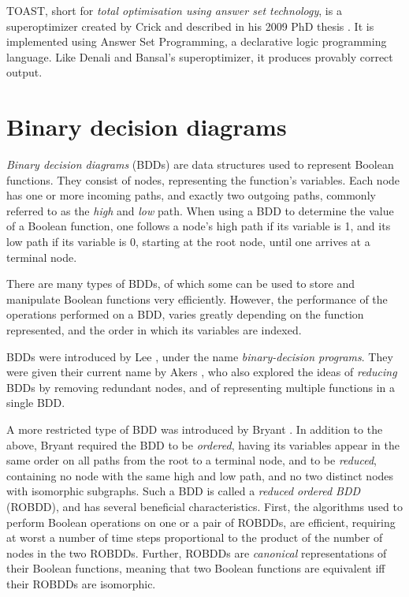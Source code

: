 \documentclass[a4paper,11pt]{kth-mag}
\begin{document}
TOAST, short for \emph{total optimisation using answer set technology}, is a superoptimizer created by Crick and described in his 2009 PhD thesis \cite{crick_thesis}.
It is implemented using Answer Set Programming, a declarative logic programming language.
Like Denali and Bansal's superoptimizer, it produces provably correct output.

%

\section{Binary decision diagrams}

\emph{Binary decision diagrams} (BDDs) are data structures used to represent Boolean functions.
They consist of nodes, representing the function's variables. Each node has one or more incoming paths, and exactly two outgoing paths, commonly referred to as the \emph{high} and \emph{low} path.
When using a BDD to determine the value of a Boolean function, one follows a node's high path if its variable is 1, and its low path if its variable is 0, starting at the root node, until one arrives at a terminal node.

There are many types of BDDs, of which some can be used to store and manipulate Boolean functions very efficiently.
However, the performance of the operations performed on a BDD, varies greatly depending on the function represented, and the order in which its variables are indexed.

BDDs were introduced by Lee \cite{lee59}, under the name \emph{binary-decision programs}.
They were given their current name by Akers \cite{akers78}, who also explored the ideas of \emph{reducing} BDDs by removing redundant nodes, and of representing multiple functions in a single BDD.

A more restricted type of BDD was introduced by Bryant \cite{bryant86}.
In addition to the above, Bryant required the BDD to be \emph{ordered}, having its variables appear in the same order on all paths from the root to a terminal node,
and to be \emph{reduced}, containing no node with the same high and low path, and no two distinct nodes with isomorphic subgraphs.
Such a BDD is called a \emph{reduced ordered BDD} (ROBDD), and has several beneficial characteristics.
First, the algorithms used to perform Boolean operations on one or a pair of ROBDDs, are efficient, requiring at worst a number of time steps proportional to the product of the number of nodes in the two ROBDDs.
Further, ROBDDs are \emph{canonical} representations of their Boolean functions, meaning that two Boolean functions are equivalent iff their ROBDDs are isomorphic.
\end{document}
